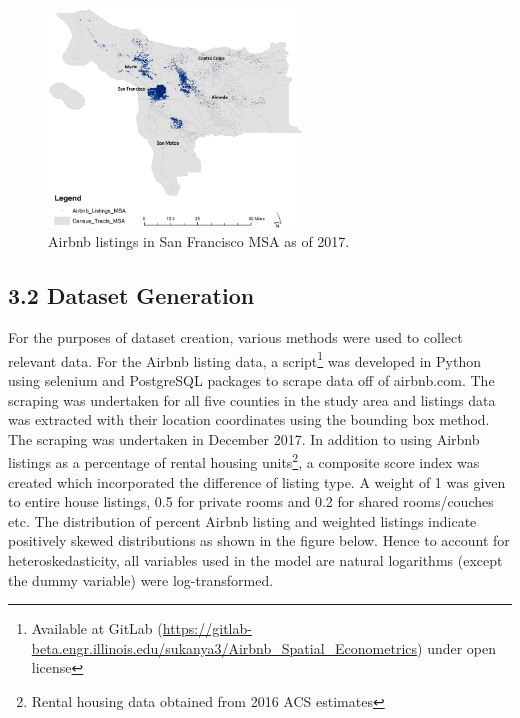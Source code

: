 \documentclass[10pt,letterpaper,onecolumn]{article}
\begin{document}
\begin{figure}[H]
  \centering
  \includegraphics[width=0.6\textwidth]{Airbnb_listings.png}
  \caption{Airbnb listings in San Francisco MSA as of 2017.}
\end{figure}


\subsection*{3.2 Dataset Generation}

For the purposes of dataset creation, various methods were used to
collect relevant data. For the Airbnb listing data, a script\footnote{Available
at GitLab
(\url{https://gitlab-beta.engr.illinois.edu/sukanya3/Airbnb_Spatial_Econometrics})
under open license} was developed in Python using selenium and
PostgreSQL packages to scrape data off of airbnb.com. The scraping was
undertaken for all five counties in the study area and listings data was
extracted with their location coordinates using the bounding box method.
The scraping was undertaken in December 2017. In addition to using
Airbnb listings as a percentage of rental housing units\footnote{Rental
housing data obtained from 2016 ACS estimates}, a composite score
index was created which incorporated the difference of listing type. A
weight of 1 was given to entire house listings, 0.5 for private rooms
and 0.2 for shared rooms/couches etc. The distribution of percent Airbnb
listing and weighted listings indicate positively skewed distributions
as shown in the figure below. Hence to account for heteroskedasticity,
all variables used in the model are natural logarithms (except the dummy
variable) were log-transformed.
\end{document}
